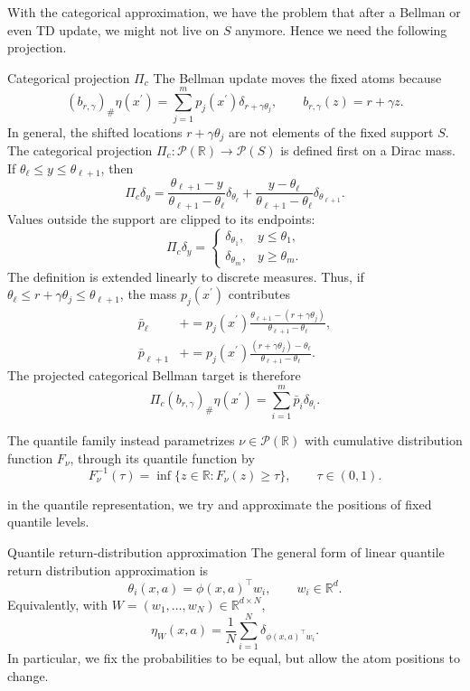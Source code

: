 \documentclass[12pt]{article}
\newcommand{\R}{\mathbb{R}}
\newcommand{\1}{\mathds{1}}
\begin{document}
With the categorical approximation, we have the problem that after a Bellman or even TD update, we might not live on $S$ anymore. Hence we need the following projection.



\begin{definition}{Categorical projection $\Pi_c$}{}
The Bellman update moves the fixed atoms because
$$
  (b_{r,\gamma})_\#\eta(x^{\prime})
  =
  \sum_{j=1}^m p_j(x^{\prime})
  \delta_{r+\gamma\theta_j},
  \qquad
  b_{r,\gamma}(z)=r+\gamma z.
$$
In general, the shifted locations $r+\gamma\theta_j$ are not elements of the
fixed support $S$. The categorical projection
$\Pi_c:\mathcal P(\R)\to\mathcal P(S)$ is defined first on a Dirac mass. If
$\theta_\ell\leq y\leq\theta_{\ell+1}$, then
$$
  \Pi_c\delta_y
  =
  \frac{\theta_{\ell+1}-y}{\theta_{\ell+1}-\theta_\ell}
  \delta_{\theta_\ell}
  +
  \frac{y-\theta_\ell}{\theta_{\ell+1}-\theta_\ell}
  \delta_{\theta_{\ell+1}}.
$$
Values outside the support are clipped to its endpoints:
$$
  \Pi_c\delta_y
  =
  \begin{cases}
    \delta_{\theta_1}, & y\leq\theta_1,\\
    \delta_{\theta_m}, & y\geq\theta_m.
  \end{cases}
$$
The definition is extended linearly to discrete measures. Thus, if
$\theta_\ell\leq r+\gamma\theta_j\leq\theta_{\ell+1}$, the mass
$p_j(x^{\prime})$ contributes
$$
\begin{aligned}
  \bar p_\ell
  &\mathrel{+}=
  p_j(x^{\prime})
  \frac{\theta_{\ell+1}-(r+\gamma\theta_j)}
       {\theta_{\ell+1}-\theta_\ell},\\
  \bar p_{\ell+1}
  &\mathrel{+}=
  p_j(x^{\prime})
  \frac{(r+\gamma\theta_j)-\theta_\ell}
       {\theta_{\ell+1}-\theta_\ell}.
\end{aligned}
$$
The projected categorical Bellman target is therefore
$$
  \Pi_c(b_{r,\gamma})_\#\eta(x^{\prime})
  =
  \sum_{i=1}^m\bar p_i\delta_{\theta_i}.
$$
\end{definition}

The quantile family instead parametrizes $\nu \in \mathcal{P}(\R)$ with
cumulative distribution function $F_\nu$, through its quantile function by
$$
  F_\nu^{-1}(\tau)
  =
  \inf\{z\in\R : F_\nu(z)\geq \tau\},
  \qquad \tau\in(0,1).
$$

in the quantile representation, we try and approximate the positions of fixed quantile levels. 

\begin{definition}{Quantile return-distribution approximation}{}
The general form of linear quantile return distribution approximation is 
$$
  \theta_i(x,a)=\phi(x,a)^\top w_i,
  \qquad w_i\in\R^d.
$$
Equivalently, with $W=(w_1,\ldots,w_N)\in\R^{d\times N}$,
$$
  \eta_W(x,a)
  =
  \frac{1}{N}\sum_{i=1}^N
  \delta_{\phi(x,a)^\top w_i}.
$$
In particular, we fix the probabilities to be equal, but allow the atom positions to change.
\end{definition}
\end{document}
